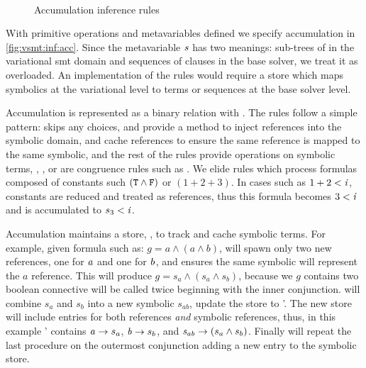 ~\label{section:vsmt:accumulation}
%
\begin{figure}
  
  \caption{Accumulation inference rules}%
  \label{fig:vsmt:inf:acc}
\end{figure}
%
%
With primitive operations and metavariables defined we specify accumulation in
\autoref{fig:vsmt:inf:acc}. Since the metavariable $\mathit{s}$ has two meanings:
sub-trees of  in the variational \ac{smt} domain and sequences of
clauses in the base solver, we treat it as overloaded.
%
An implementation of the rules would require a store which maps symbolics at
the variational level to terms or sequences at the base solver level.

Accumulation is represented as a binary relation with \accumulation{}. The rules
follow a simple pattern:  skips any choices,  and
 provide a method to inject references into the symbolic domain,
 and  cache references to ensure the same
reference is mapped to the same symbolic, and the rest of the rules provide
operations on symbolic terms, \eg{}, , or are congruence rules
such as . We elide rules which process formulas composed of
constants such $\mathit{(\texttt{T}{} \wedge \texttt{F}{})}$ or $(1 + 2 + 3)$. In cases such as
$1 + 2 < \mathit{i}$, constants are reduced and treated as references, thus this
formula becomes $3 < \mathit{i}$ and is accumulated to $s_{3} < \mathit{i}$.

Accumulation maintains a store, \aStore{}, to track and cache symbolic terms.
For example, given formula such as: $g = a \wedge (a \wedge b)$, 
will spawn only two new references, one for $\mathit{a}$ and one for $\mathit{b}$, and
 ensures the same symbolic will represent the $a$ reference. This
will produce $g = s_{a} \wedge (s_{a} \wedge s_{b})$, because we $g$ contains
two boolean connective  will be called twice beginning with the
inner conjunction.  will combine $s_{a}$ and $s_{b}$ into a new
symbolic $s_{ab}$, update the store to \aStore{}'. The new store will include
entries for both references \textit{and} symbolic references, thus, in this
example \aStore{}' contains $\mathit{a} \rightarrow s_{a}$, $\mathit{b} \rightarrow
s_{b}$, and $\mathit{s_{ab}} \rightarrow (s_{a} \wedge s_{b})$. Finally
 will repeat the last procedure on the outermost conjunction
adding a new entry to the symbolic store.



